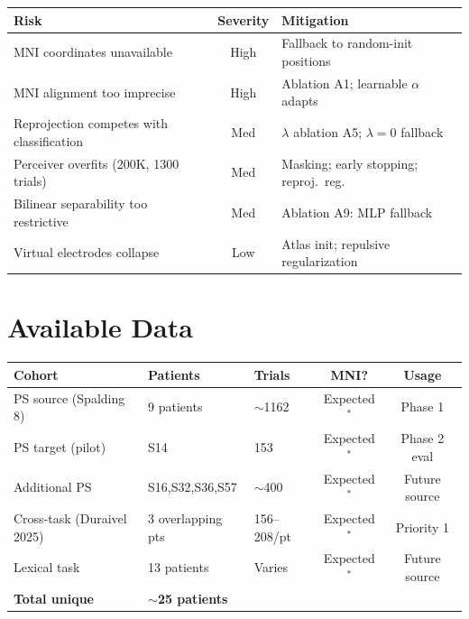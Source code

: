 \documentclass[11pt,letterpaper]{article}
\begin{document}
\begin{table}[ht!]\centering\small
\begin{tabular}{@{}p{}cp{}@{}}
\toprule
\textbf{Risk} & \textbf{Severity} & \textbf{Mitigation} \\
\midrule
MNI coordinates unavailable & High & Fallback to random-init positions \\
MNI alignment too imprecise & High & Ablation A1; learnable $\alpha$ adapts \\
Reprojection competes with classification & Med & $\lambda$ ablation A5; $\lambda{=}0$ fallback \\
Perceiver overfits (200K, 1300 trials) & Med & Masking; early stopping; reproj.\ reg. \\
Bilinear separability too restrictive & Med & Ablation A9: MLP fallback \\
Virtual electrodes collapse & Low & Atlas init; repulsive regularization \\
\bottomrule
\end{tabular}
\end{table}



\section{Available Data}\label{sec:data}

\begin{table}[ht!]\centering\small
\begin{tabular}{@{}lllcc@{}}
\toprule
\textbf{Cohort} & \textbf{Patients} & \textbf{Trials} & \textbf{MNI?} & \textbf{Usage} \\
\midrule
PS source (Spalding 8) & 9 patients & ${\sim}$1162 & Expected$^*$ & Phase 1 \\
PS target (pilot) & S14 & 153 & Expected$^*$ & Phase 2 eval \\
Additional PS & S16,S32,S36,S57 & ${\sim}$400 & Expected$^*$ & Future source \\
Cross-task (Duraivel 2025) & 3 overlapping pts & 156--208/pt & Expected$^*$ & Priority 1 \\
Lexical task & 13 patients & Varies & Expected$^*$ & Future source \\
\midrule
\textbf{Total unique} & \textbf{${\sim}$25 patients} & & & \\
\bottomrule
\end{tabular}
\end{table}
\end{document}

